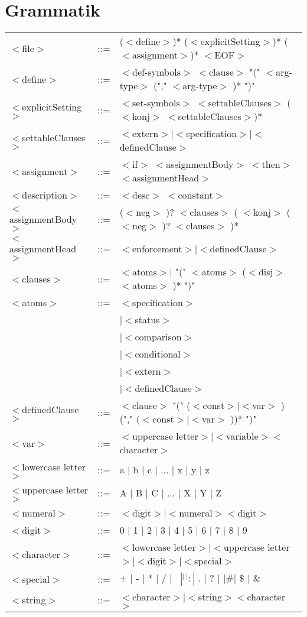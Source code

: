 
\chapter{Grammatik} %

\label{Grammatik} %



\begin{tabular}{lll}
$<$file$>$ 		&::=& ($<$define$>$)* ($<$explicitSetting$>$)* ($<$assignment$>$)*  $<$EOF$>$\\
$<$define$>$ 		&::=& $<$def-symbols$>$ $<$clause$>$ "(" $<$arg-type$>$ ("," $<$arg-type$>$ )* ")" \\
$<$explicitSetting$>$ 	&::=& $<$set-symbols$>$ $<$settableClauses$>$ ($<$konj$>$ $<$settableClauses$>$)* \\
$<$settableClauses$>$	&::=& $<$extern$>|<$specification$>|<$definedClause$>$ \\
$<$assignment$>$ 	&::=& $<$if$>$ $<$assignmentBody$>$ $<$then$>$ $<$assignmentHead$>$ \\
$<$description$>$ 	&::=& $<$desc$>$  $<$constant$>$ \\
$<$assignmentBody$>$  	&::=& ($<$neg$>$ )? $<$clauses$>$  ( $<$konj$>$  ($<$neg$>$ )? $<$clauses$>$ )* \\
$<$assignmentHead$>$ 	&::=& $<$enforcement$>|<$definedClause$>$\\
$<$clauses$>$ 		&::=& $<$atoms$>|$ "(" $<$atoms$>$  ($<$disj$>$  $<$atoms$>$ )* ")"\\
$<$atoms$>$ 		&::=& $<$specification$>$ 	\\	
			&&	$| <$status$>$ \\
			&&	$| <$comparison$>$ \\
			&&	$| <$conditional$>$ \\
			&&	$| <$extern$>$ \\
			&&	$| <$definedClause$>$ \\
$<$definedClause$>$ 	&::=& $<$clause$>$  "(" ($<$const$>|<$var$>$ ) ("," ($<$const$>|<$var$>$ ))* ")"\\
\hline
$<$var$>$ 		&::=& $<$uppercase letter$> | <$variable$> <$character$>$\\
$<$lowercase letter$>$  &::=& a $|$ b $|$ c $|$ ... $|$ x $|$ y $|$ z\\
$<$uppercase letter$>$  &::=& A $|$ B $|$ C $|$ ... $|$ X $|$ Y $|$ Z \\
$<$numeral$>$  		&::=& $<$digit$> | <$numeral$> <$digit$>$\\
$<$digit$>$  		&::=& 0 $|$ 1 $|$ 2 $|$ 3 $|$ 4 $|$ 5 $|$ 6 $|$ 7 $|$ 8 $|$ 9\\
$<$character$>$  	&::=& $<$lowercase letter$> | <$uppercase letter$> | <$digit$> | <$special$>$\\
$<$special$>$  		&::=& + $|$ - $|$ * $|$ / $|$ \ $| ^ | ~ | : |$ . $|$ ? $|$  $| \# |$ \$ $|$ \&\\
$<$string$>$  		&::=& $<$character$> | <$string$> <$character$>$
\end{tabular}


